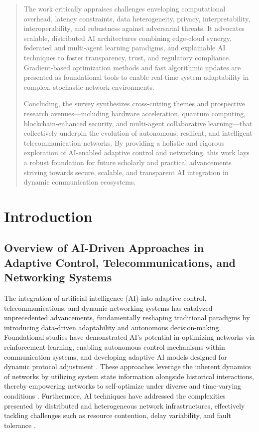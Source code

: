 \documentclass[11pt]{article}
\begin{document}
\begin{abstract}
The work critically appraises challenges enveloping computational overhead, latency constraints, data heterogeneity, privacy, interpretability, interoperability, and robustness against adversarial threats. It advocates scalable, distributed AI architectures combining edge-cloud synergy, federated and multi-agent learning paradigms, and explainable AI techniques to foster transparency, trust, and regulatory compliance. Gradient-based optimization methods and fast algorithmic updates are presented as foundational tools to enable real-time system adaptability in complex, stochastic network environments.

Concluding, the survey synthesizes cross-cutting themes and prospective research avenues—including hardware acceleration, quantum computing, blockchain-enhanced security, and multi-agent collaborative learning—that collectively underpin the evolution of autonomous, resilient, and intelligent telecommunication networks. By providing a holistic and rigorous exploration of AI-enabled adaptive control and networking, this work lays a robust foundation for future scholarly and practical advancements striving towards secure, scalable, and transparent AI integration in dynamic communication ecosystems.
\end{abstract}\section{Introduction}

\subsection{Overview of AI-Driven Approaches in Adaptive Control, Telecommunications, and Networking Systems}

The integration of artificial intelligence (AI) into adaptive control, telecommunications, and dynamic networking systems has catalyzed unprecedented advancements, fundamentally reshaping traditional paradigms by introducing data-driven adaptability and autonomous decision-making. Foundational studies have demonstrated AI's potential in optimizing networks via reinforcement learning, enabling autonomous control mechanisms within communication systems, and developing adaptive AI models designed for dynamic protocol adjustment \cite{ref17,ref18,ref19,ref20}. These approaches leverage the inherent dynamics of networks by utilizing system state information alongside historical interactions, thereby empowering networks to self-optimize under diverse and time-varying conditions \cite{ref1,ref2,ref3}. Furthermore, AI techniques have addressed the complexities presented by distributed and heterogeneous network infrastructures, effectively tackling challenges such as resource contention, delay variability, and fault tolerance \cite{ref4,ref5,ref6}. 
\end{document}
